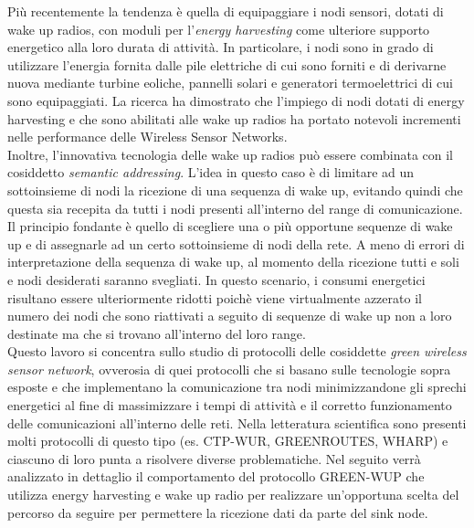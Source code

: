 \documentclass[binding=0.6cm,TFA]{sapthesis}
\begin{document}
Più recentemente la tendenza è quella di equipaggiare i nodi sensori, dotati di wake up radios, con moduli per l'\emph{energy harvesting} come ulteriore
supporto energetico alla loro durata di attività. In particolare, i nodi sono in grado di utilizzare l'energia fornita dalle pile elettriche di cui sono
forniti e di derivarne nuova mediante turbine eoliche, pannelli solari e generatori termoelettrici di cui sono equipaggiati. La ricerca ha dimostrato che
l'impiego di nodi dotati di energy harvesting \cite{energy-harvesting-paper} e che sono abilitati alle wake up radios \cite{wake-up-radios-paper} ha
portato notevoli incrementi nelle performance delle Wireless Sensor Networks.\\

Inoltre, l'innovativa tecnologia delle wake up radios può essere combinata con il cosiddetto \emph{semantic addressing}. L'idea in questo caso è di limitare
ad un sottoinsieme di nodi la ricezione di una sequenza di wake up, evitando quindi che questa sia recepita da tutti i nodi presenti all'interno
del range di comunicazione. Il principio fondante è quello di scegliere una o più opportune sequenze di wake up e di assegnarle ad un certo
sottoinsieme di nodi della rete. A meno di errori di interpretazione della sequenza di wake up, al momento della ricezione tutti e soli e nodi desiderati
saranno svegliati. In questo scenario, i consumi energetici risultano essere ulteriormente ridotti poichè viene virtualmente azzerato il numero dei nodi
che sono riattivati a seguito di sequenze di wake up non a loro destinate ma che si trovano all'interno del loro range.\\

Questo lavoro si concentra sullo studio di protocolli delle cosiddette \emph{green wireless sensor network}, ovverosia di quei protocolli che si basano
sulle tecnologie sopra esposte e che implementano la comunicazione tra nodi minimizzandone gli sprechi energetici al fine di massimizzare
i tempi di attività e il corretto funzionamento delle comunicazioni all'interno delle reti. Nella letteratura scientifica
sono presenti molti protocolli di questo tipo (es. CTP-WUR, GREENROUTES, WHARP) e ciascuno di loro punta a risolvere diverse problematiche.
Nel seguito verrà analizzato in dettaglio il comportamento del protocollo GREEN-WUP che utilizza energy harvesting e wake up radio per realizzare
un'opportuna scelta del percorso da seguire per permettere la ricezione dati da parte del sink node.\\
\end{document}
